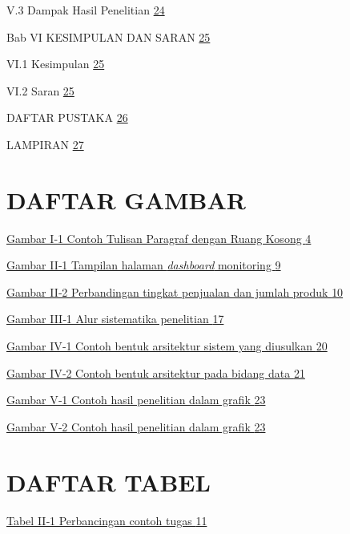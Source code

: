 V.3 Dampak Hasil Penelitian \protect\hyperlink{_Toc211426863}{24}

Bab VI KESIMPULAN DAN SARAN \protect\hyperlink{_Toc211426864}{25}

VI.1 Kesimpulan \protect\hyperlink{_Toc211426865}{25}

VI.2 Saran \protect\hyperlink{_Toc211426866}{25}

DAFTAR PUSTAKA \protect\hyperlink{daftar-pustaka}{26}

LAMPIRAN \protect\hyperlink{lampiran}{27}

\hypertarget{daftar-gambar}{%
\section{DAFTAR GAMBAR}\label{daftar-gambar}}

\protect\hyperlink{_Toc211422568}{Gambar I‑1 Contoh Tulisan Paragraf
dengan Ruang Kosong \protect\hyperlink{_Toc211422568}{4}}

\protect\hyperlink{_Toc211422569}{Gambar II‑1 Tampilan halaman
\emph{dashboard} monitoring \protect\hyperlink{_Toc211422569}{9}}

\protect\hyperlink{_Toc211422570}{Gambar II‑2 Perbandingan tingkat
penjualan dan jumlah produk \protect\hyperlink{_Toc211422570}{10}}

\protect\hyperlink{_Toc211422571}{Gambar III‑1 Alur sistematika
penelitian \protect\hyperlink{_Toc211422571}{17}}

\protect\hyperlink{_Toc211422572}{Gambar IV‑1 Contoh bentuk arsitektur
sistem yang diusulkan \protect\hyperlink{_Toc211422572}{20}}

\protect\hyperlink{_Toc211422573}{Gambar IV‑2 Contoh bentuk arsitektur
pada bidang data \protect\hyperlink{_Toc211422573}{21}}

\protect\hyperlink{_Toc211422574}{Gambar V‑1 Contoh hasil penelitian
dalam grafik \protect\hyperlink{_Toc211422574}{23}}

\protect\hyperlink{_Toc211422575}{Gambar V‑2 Contoh hasil penelitian
dalam grafik \protect\hyperlink{_Toc211422575}{23}}

\hypertarget{daftar-tabel}{%
\section{DAFTAR TABEL}\label{daftar-tabel}}

\protect\hyperlink{_Toc211422712}{Tabel II‑1 Perbancingan contoh tugas
\protect\hyperlink{_Toc211422712}{11}}

